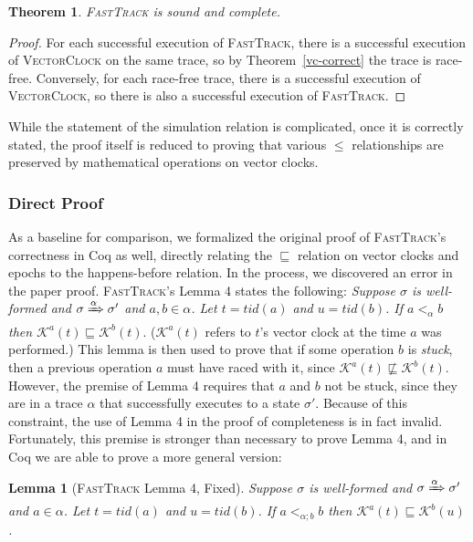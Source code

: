 \documentclass[preprint, 10pt]{sigplanconf}
\newcommand{\ignore}[1]{}
\newcommand{\VCalg}{\textsc{VectorClock}\xspace}
\newcommand{\FT}{\textsc{FastTrack}\xspace}
\newtheorem{lemma}{Lemma}
\newtheorem{theorem}{Theorem}
\begin{document}
\begin{theorem}\FT is sound and complete.\end{theorem}
\begin{proof}For each successful execution of \FT, there is a successful execution of \VCalg on the same trace, so by Theorem~\ref{vc-correct} the trace is race-free. Conversely, for each race-free trace, there is a successful execution of \VCalg, so there is also a successful execution of \FT.\end{proof}

While the statement of the simulation relation is complicated, once it is correctly stated, the proof itself is reduced to proving that various $\le$ relationships are preserved by mathematical operations on vector clocks. \ignore{We expect that the arithmetic involved could be further automated, decreasing the burden of verifying related algorithms.}

\subsubsection{Direct Proof}
\label{bug}
As a baseline for comparison, we formalized the original proof of \FT's correctness in Coq as well, directly relating the $\sqsubseteq$ relation on vector clocks and epochs to the happens-before relation. In the process, we discovered an error in the paper proof. \FT's Lemma 4 states the following: {\it Suppose $\sigma$ is well-formed and $\sigma \xRightarrow{\alpha} \sigma'$ and $a, b \in \alpha$. Let $t = \mathit{tid}(a)$ and $u = \mathit{tid}(b)$. If $a <_{\alpha} b$ then $\mathcal{K}^a(t) \sqsubseteq \mathcal{K}^b(t).$} ($\mathcal{K}^a(t)$ refers to $t$'s vector clock at the time $a$ was performed.) This lemma is then used to prove that if some operation $b$ is \emph{stuck}, then a previous operation $a$ must have raced with it, since $\mathcal{K}^a(t) \not\sqsubseteq \mathcal{K}^b(t)$. However, the premise of Lemma 4 requires that $a$ and $b$ not be stuck, since they are in a trace $\alpha$ that successfully executes to a state $\sigma'$. Because of this constraint, the use of Lemma 4 in the proof of completeness is in fact invalid. Fortunately, this premise is stronger than necessary to prove Lemma 4, and in Coq we are able to prove a more general version:

\begin{lemma}[\FT Lemma 4, Fixed] Suppose $\sigma$ is well-formed and $\sigma
    \xRightarrow{\alpha} \sigma'$ and $a \in \alpha$. Let $t =
    \mathit{tid}(a)$ and $u = \mathit{tid}(b)$. If $a <_{\alpha; b} b$
    then $\mathcal{K}^a(t) \sqsubseteq \mathcal{K}^b(u)$.
\end{lemma}
\end{document}
